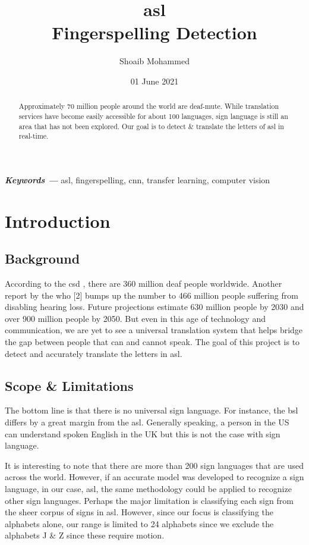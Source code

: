 \documentclass[twocolumn]{article}
\title{\gls{asl}\\
	Fingerspelling Detection}
\author{Shoaib Mohammed}
\date{01 June 2021}
\providecommand{\keywords}[1]
{
  \small
  \noindent \textbf{\textit{Keywords ---}} #1
}
\begin{document}
\begin{titlingpage}
\maketitle
\end{titlingpage}

\begin{abstract}
Approximately 70 million people around the world are deaf-mute. While 
translation services have become easily accessible for about 100 
languages, sign language is still an area that has not been explored. 
Our goal is to detect \& translate the letters of \gls{asl} in real-time.
\end{abstract}

\keywords{\gls{asl}, fingerspelling, \gls{cnn}, transfer learning, 
computer vision}


\section{Introduction}

\subsection{Background}
According to the \gls{csd} \cite{csd}, there are 360 million deaf people 
worldwide. Another report by the \gls{who} [2] bumps up the number to 466 
million people suffering from disabling hearing loss. Future projections 
estimate 630 million people by 2030 and over 900 million people by 2050. 
But even in this age of technology and communication, we are yet to see a 
universal translation system that helps bridge the gap between people that 
can and cannot speak. The goal of this project is to detect and accurately 
translate the letters in \gls{asl}.

\subsection{Scope \& Limitations}
The bottom line is that there is no universal sign language. For instance, the 
\gls{bsl} differs by a great margin from the \gls{asl}. Generally speaking, a 
person in the US can understand spoken English in the UK but this is not the 
case with sign language.

It is interesting to note that there are more than 200 sign languages that are 
used across the world. However, if an accurate model was developed to 
recognize a sign language, in our case, \gls{asl}, the same methodology could be 
applied to recognize other sign languages. Perhaps the major limitation is 
classifying each sign from the sheer corpus of signs in \gls{asl}.
However, since our focus is classifying the alphabets alone, our range is 
limited to 24 alphabets since we exclude the alphabets J \& Z since these 
require motion.
\end{document}
